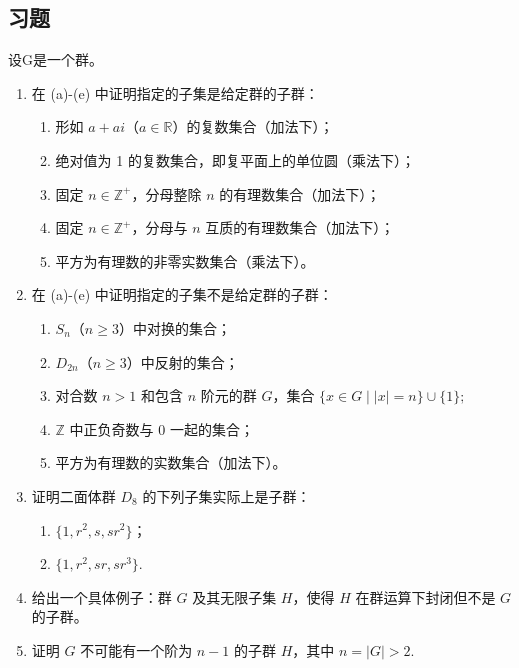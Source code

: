 \subsection*{习题}
设G是一个群。
\begin{enumerate}
\item 在 (a)-(e) 中证明指定的子集是给定群的子群：
\begin{enumerate}[label=(\alph*)]
\item 形如 \( a + ai \)（\( a \in \mathbb{R} \)）的复数集合（加法下）；
\item 绝对值为 1 的复数集合，即复平面上的单位圆（乘法下）；
\item 固定 \( n \in \mathbb{Z}^+ \)，分母整除 \( n \) 的有理数集合（加法下）；
\item 固定 \( n \in \mathbb{Z}^+ \)，分母与 \( n \) 互质的有理数集合（加法下）；
\item 平方为有理数的非零实数集合（乘法下）。
\end{enumerate}

\item 在 (a)-(e) 中证明指定的子集不是给定群的子群：
\begin{enumerate}[label=(\alph*)]
\item \( S_n \)（\( n \geq 3 \)）中对换的集合；
\item \( D_{2n} \)（\( n \geq 3 \)）中反射的集合；
\item 对合数 \( n > 1 \) 和包含 \( n \) 阶元的群 \( G \)，集合
\(
\{ x \in G \mid |x| = n \} \cup \{ 1 \};
\)
\item \( \mathbb{Z} \) 中正负奇数与 0 一起的集合；
\item 平方为有理数的实数集合（加法下）。
\end{enumerate}

\item 证明二面体群 \( D_8 \) 的下列子集实际上是子群：
\begin{enumerate}[label=(\alph*)]
\item \( \{ 1, r^2, s, sr^2 \} \)；
\item \( \{ 1, r^2, sr, sr^3 \} \).
\end{enumerate}

\item 给出一个具体例子：群 \( G \) 及其无限子集 \( H \)，使得 \( H \) 在群运算下封闭但不是 \( G \) 的子群。

\item 证明 \( G \) 不可能有一个阶为 \( n-1 \) 的子群 \( H \)，其中 \( n = |G| > 2 \).


\end{enumerate}
